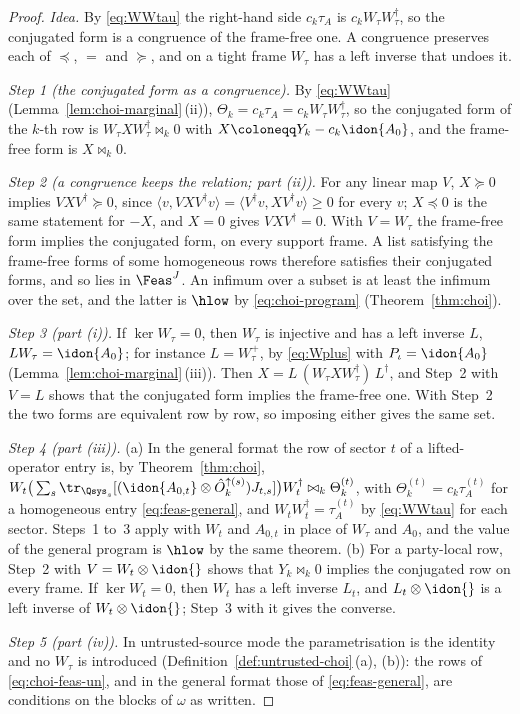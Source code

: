 \begin{proof}
\emph{Idea.} By \eqref{eq:WWtau} the right-hand side $c_k\tau_A$ is
$c_kW_{\tau}W_{\tau}^{\dagger}$, so the conjugated form is a congruence of
the frame-free one. A congruence preserves each of $\preceq$, $=$ and
$\succeq$, and on a tight frame $W_{\tau}$ has a left inverse that undoes
it.

\emph{Step 1 (the conjugated form as a congruence).} By \eqref{eq:WWtau}
(Lemma~\ref{lem:choi-marginal}\,(ii)),
$\Theta_k=c_k\tau_A=c_kW_{\tau}W_{\tau}^{\dagger}$, so the conjugated form
of the $k$-th row is $W_{\tau}XW_{\tau}^{\dagger}\bowtie_k0$ with
$X\coloneqq Y_k-c_k\idon{A_0}$, and the frame-free form is
$X\bowtie_k0$.

\emph{Step 2 (a congruence keeps the relation; part (ii)).} For any linear
map $V$, $X\succeq0$ implies $VXV^{\dagger}\succeq0$, since
$\langle v,VXV^{\dagger}v\rangle=\langle V^{\dagger}v,XV^{\dagger}v\rangle
\ge0$ for every $v$; $X\preceq0$ is the same statement for $-X$, and $X=0$
gives $VXV^{\dagger}=0$. With $V=W_{\tau}$ the frame-free form implies the
conjugated form, on every support frame. A list satisfying the frame-free
forms of some homogeneous rows therefore satisfies their conjugated forms,
and so lies in $\Feas^{J}$. An infimum over a subset is at least the
infimum over the set, and the latter is $\hlow$ by \eqref{eq:choi-program}
(Theorem~\ref{thm:choi}).

\emph{Step 3 (part (i)).} If $\ker W_{\tau}=0$, then $W_{\tau}$ is
injective and has a left inverse $L$, $LW_{\tau}=\idon{A_0}$; for instance
$L=W_{\tau}^{+}$, by \eqref{eq:Wplus} with $P_{\iota}=\idon{A_0}$
(Lemma~\ref{lem:choi-marginal}\,(iii)). Then
$X=L\,(W_{\tau}XW_{\tau}^{\dagger})\,L^{\dagger}$, and Step~2 with $V=L$
shows that the conjugated form implies the frame-free one. With Step~2 the
two forms are equivalent row by row, so imposing either gives the same
set.

\emph{Step 4 (part (iii)).} (a) In the general format the row of sector $t$
of a lifted-operator entry is, by Theorem~\ref{thm:choi},
$W_t\big(\sum_s\tr_{\Qsys_s}[(\idon{A_{0,t}}\otimes\hat O^{\uparrow(s)}_k)
J_{t,s}]\big)W_t^{\dagger}\bowtie_k\Theta^{(t)}_k$, with
$\Theta^{(t)}_k=c_k\tau^{(t)}_A$ for a homogeneous entry
\eqref{eq:feas-general}, and $W_tW_t^{\dagger}=\tau^{(t)}_A$ by
\eqref{eq:WWtau} for each sector. Steps~1 to~3 apply with $W_t$ and
$A_{0,t}$ in place of $W_{\tau}$ and $A_0$, and the value of the general
program is $\hlow$ by the same theorem. (b) For a party-local row, Step~2
with $V=W_t\otimes\idon{}$ shows that $Y_k\bowtie_k0$ implies the conjugated
row on every frame. If $\ker W_t=0$, then $W_t$ has a left inverse $L_t$,
and $L_t\otimes\idon{}$ is a left inverse of $W_t\otimes\idon{}$; Step~3
with it gives the converse.

\emph{Step 5 (part (iv)).} In untrusted-source mode the parametrisation is
the identity and no $W_{\tau}$ is introduced
(Definition~\ref{def:untrusted-choi}\,(a), (b)): the rows of
\eqref{eq:choi-feas-un}, and in the general format those of
\eqref{eq:feas-general}, are conditions on the blocks of $\omega$ as
written.
\end{proof}

